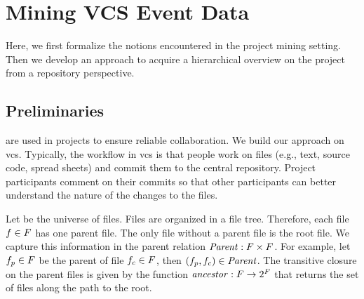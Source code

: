 \section{Mining VCS Event Data}
\label{sec:bpm2015:concept}
Here, we first formalize the notions encountered in the project mining setting. Then we develop an approach to acquire a hierarchical overview on the project from a repository perspective.

\subsection{Preliminaries}
 are used in projects to ensure reliable collaboration. We build our approach on \gls{vcs}. Typically, the workflow in \gls{vcs} is that people work on files (e.g., text, source code, spread sheets) and commit them to the central repository. Project participants comment on their commits so that other participants can better understand the nature of the changes to the files.

Let \Files be the universe of files. Files are organized in a file tree. Therefore, each file $f \in F$ has one parent file. The only file without a parent file is the root file. We capture this information in the parent relation $\mathit{Parent} : F \times F$. For example, let $f_p \in F$ be the parent of file $f_c \in F$, then $(f_p, f_c) \in \mathit{Parent}$.
The transitive closure on the parent files is given by the function $\mathit{ancestor} : F \rightarrow 2^{F}$ that returns the set of files along the path to the root.

